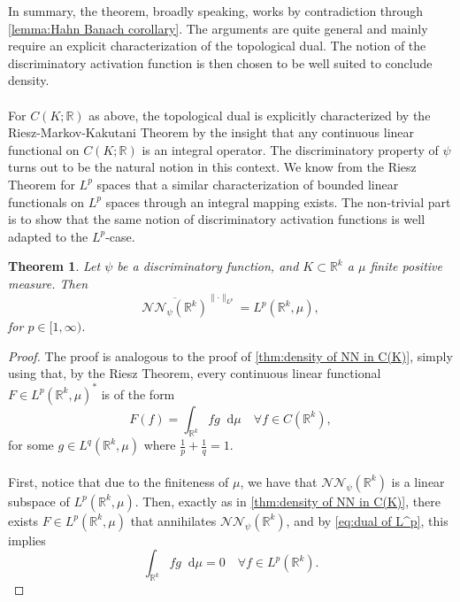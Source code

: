 \documentclass[11pt,a4paper,twoside,openany]{report}
\newcommand{\diff}{\mathop{}\!\mathrm{d}}
\theoremstyle{plain} %
\newtheorem{theorem}{Theorem}[chapter]
\theoremstyle{definition} %
\theoremstyle{remark} %
\let\parencite\authnumparencite
\begin{document}
In summary, the theorem, broadly speaking, works by contradiction through \cref{lemma:Hahn Banach corollary}. The arguments are quite general and mainly require an explicit characterization of the topological dual. The notion of the discriminatory activation function is then chosen to be well suited to conclude density.
\\\\
For \(C(K;\mathbb{R})\) as above, the topological dual is explicitly characterized by the Riesz-Markov-Kakutani Theorem by the insight that any continuous linear functional on \(C(K;\mathbb{R})\) is an integral operator. The discriminatory property of \(\psi\) turns out to be the natural notion in this context. We know from the Riesz Theorem for \(L^p\) spaces \parencite[Thm.~4.4.1.]{Bogachev2007MeasureTheory} that a similar characterization of bounded linear functionals on \(L^p\) spaces through an integral mapping exists. The non-trivial part is to show that the same notion of discriminatory activation functions is well adapted to the \(L^p\)-case.
\begin{theorem}\label{thm:density of NN in L^p}
    Let \(\psi\) be a discriminatory function, and \(K\subset\mathbb{R}^k\) a \(\mu\) finite positive measure. Then
    \begin{equation}
         \overline{\mathcal{NN}_{\psi}(\mathbb{R}^k)}^{\lVert\cdot\rVert_{L^p}}=L^p(\mathbb{R}^k,\mu),
    \end{equation}
    for \(p\in[1,\infty)\).
\end{theorem}
\begin{proof}
    The proof is analogous to the proof of \cref{thm:density of NN in C(K)}, simply using that, by the Riesz Theorem, every continuous linear functional  \(F\in L^p(\mathbb{R}^k,\mu)^*\) is of the form
    \begin{equation}\label{eq:dual of L^p}
        F(f)=\int_{\mathbb{R}^k}fg\diff \mu\quad\forall f\in C(\mathbb{R}^k),
    \end{equation} for some \(g\in L^q(\mathbb{R}^k,\mu)\) where \(\frac{1}{p}+\frac{1}{q}=1\). \\\\
 First, notice that due to the finiteness of \(\mu\), we have that \(\mathcal{NN}_{\psi}(\mathbb{R}^k)\) is a linear subspace of  \(L^p(\mathbb{R}^k,\mu)\). Then, exactly as in \cref{thm:density of NN in C(K)}, there exists \(F\in L^p(\mathbb{R}^k,\mu)\) that annihilates \(\mathcal{NN}_{\psi}(\mathbb{R}^k)\), and by \cref{eq:dual of L^p}, this implies
    \begin{equation}
        \int_{\mathbb{R}^k}fg\diff \mu=0\quad\forall f\in L^p(\mathbb{R}^k).
    \end{equation}
\end{proof}
\end{document}
